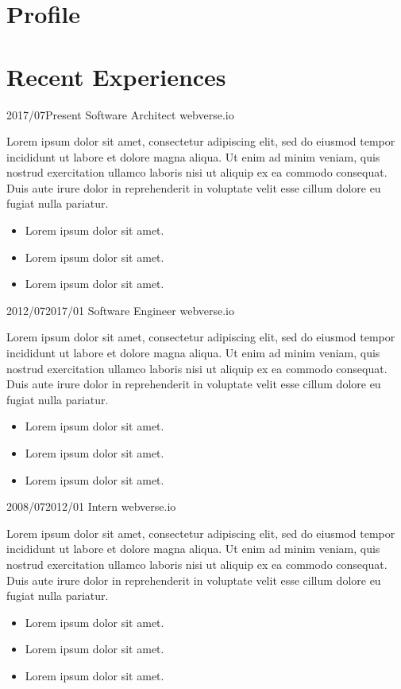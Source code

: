 \documentclass[]{cvone}
\begin{document}

\section{Profile}
\sectiontext{\textcolor{customgrey}{
    \lipsum[1]
}}

\noindent
\begin{minipage}[t]{0.7\linewidth}
  \section{Recent Experiences}
  \employmentitem
      {2017/07}{Present}
      {Software Architect}
      {webverse.io}
      {Lorem ipsum dolor sit amet, consectetur adipiscing elit, sed do eiusmod tempor incididunt ut labore et dolore magna aliqua. Ut enim ad minim veniam, quis nostrud exercitation ullamco laboris nisi ut aliquip ex ea commodo consequat. Duis aute irure dolor in reprehenderit in voluptate velit esse cillum dolore eu fugiat nulla pariatur.
        \begin{itemize}
          \item Lorem ipsum dolor sit amet.
          \item Lorem ipsum dolor sit amet.
          \item Lorem ipsum dolor sit amet.
        \end{itemize}
      }
  \employmentitem
      {2012/07}{2017/01}
      {Software Engineer}
      {webverse.io}
      {Lorem ipsum dolor sit amet, consectetur adipiscing elit, sed do eiusmod tempor incididunt ut labore et dolore magna aliqua. Ut enim ad minim veniam, quis nostrud exercitation ullamco laboris nisi ut aliquip ex ea commodo consequat. Duis aute irure dolor in reprehenderit in voluptate velit esse cillum dolore eu fugiat nulla pariatur.
        \begin{itemize}
          \item Lorem ipsum dolor sit amet.
          \item Lorem ipsum dolor sit amet.
          \item Lorem ipsum dolor sit amet.
        \end{itemize}
      }
  \employmentitem
      {2008/07}{2012/01}
      {Intern}
      {webverse.io}
      {Lorem ipsum dolor sit amet, consectetur adipiscing elit, sed do eiusmod tempor incididunt ut labore et dolore magna aliqua. Ut enim ad minim veniam, quis nostrud exercitation ullamco laboris nisi ut aliquip ex ea commodo consequat. Duis aute irure dolor in reprehenderit in voluptate velit esse cillum dolore eu fugiat nulla pariatur.
        \begin{itemize}
          \item Lorem ipsum dolor sit amet.
          \item Lorem ipsum dolor sit amet.
          \item Lorem ipsum dolor sit amet.
        \end{itemize}
      }
\end{minipage}
\end{document}
